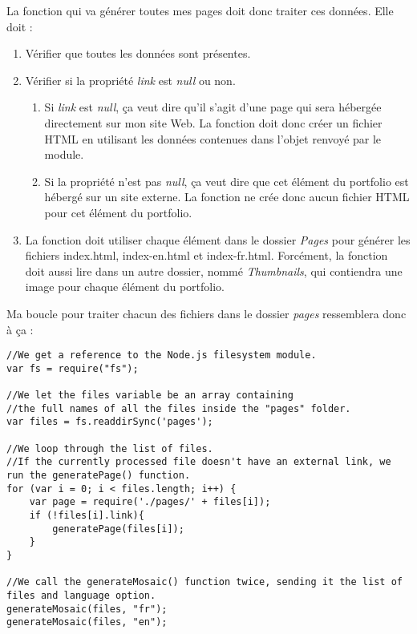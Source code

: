 La fonction qui va générer toutes mes pages doit donc traiter ces données. Elle doit :
\begin{enumerate}  
\item Vérifier que toutes les données sont présentes.
\item Vérifier si la propriété \textit{link} est \textit{null} ou non. 
\begin{enumerate} 
\item Si \textit{link} est \textit{null}, ça veut dire qu'il s'agit d'une page qui sera hébergée directement sur mon site Web. La fonction doit donc créer un fichier HTML en utilisant les données contenues dans l'objet renvoyé par le module.
\item Si la propriété n'est pas \textit{null}, ça veut dire que cet élément du portfolio est hébergé sur un site externe. La fonction ne crée donc aucun fichier HTML pour cet élément du portfolio.
\end{enumerate} 
\item La fonction doit utiliser chaque élément dans le dossier \textit{Pages} pour générer les fichiers index.html, index-en.html et index-fr.html. Forcément, la fonction doit aussi lire dans un autre dossier, nommé \textit{Thumbnails}, qui contiendra une image pour chaque élément du portfolio.

\end{enumerate}

Ma boucle pour traiter chacun des fichiers dans le dossier \textit{pages} ressemblera donc à ça :

\begin{lstlisting}
//We get a reference to the Node.js filesystem module.
var fs = require("fs");

//We let the files variable be an array containing 
//the full names of all the files inside the "pages" folder.
var files = fs.readdirSync('pages');

//We loop through the list of files.
//If the currently processed file doesn't have an external link, we run the generatePage() function.
for (var i = 0; i < files.length; i++) {
    var page = require('./pages/' + files[i]);
    if (!files[i].link){
        generatePage(files[i]);
    }
}

//We call the generateMosaic() function twice, sending it the list of files and language option.
generateMosaic(files, "fr");
generateMosaic(files, "en");

\end{lstlisting}


